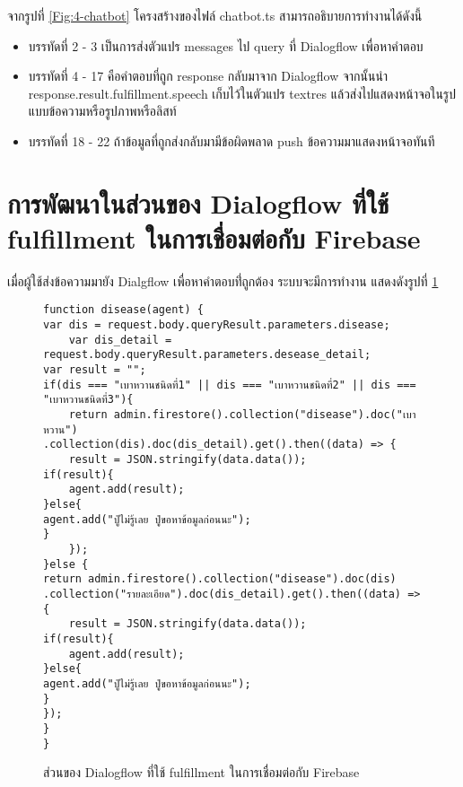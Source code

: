 จากรูปที่ \ref{Fig:4-chatbot} โครงสร้างของไฟล์ chatbot.ts สามารถอธิบายการทำงานได้ดังนี้
\begin{itemize}[label={--}]
\item บรรทัดที่ 2 - 3 เป็นการส่งตัวแปร messages ไป query ที่ Dialogflow เพื่อหาคำตอบ
\item บรรทัดที่ 4 - 17 คือคำตอบที่ถูก response กลับมาจาก Dialogflow จากนั้นนำ response.result.fulfillment.speech เก็บไว้ในตัวแปร textres แล้วส่งไปแสดงหน้าจอในรูปแบบข้อความหรือรูปภาพหรือลิสท์
\item บรรทัดที่ 18 - 22 ถ้าข้อมูลที่ถูกส่งกลับมามีข้อผิดพลาด push ข้อความมาแสดงหน้าจอทันที
\end{itemize}
\newpage



\section{การพัฒนาในส่วนของ Dialogflow ที่ใช้ fulfillment ในการเชื่อมต่อกับ Firebase}
เมื่อผู้ใช้ส่งข้อความมายัง Dialgflow เพื่อหาคำตอบที่่ถูกต้อง ระบบจะมีการทำงาน แสดงดังรูปที่ \ref{Fig:4-addchatbot}
\begin{figure}[H]
	{\begin{lstlisting}
function disease(agent) {
var dis = request.body.queryResult.parameters.disease;
	var dis_detail = request.body.queryResult.parameters.desease_detail;
var result = "";
if(dis === "เบาหวานชนิดที่1" || dis === "เบาหวานชนิดที่2" || dis === "เบาหวานชนิดที่3"){
	return admin.firestore().collection("disease").doc("เบาหวาน")
.collection(dis).doc(dis_detail).get().then((data) => {
	result = JSON.stringify(data.data());
if(result){
	agent.add(result);
}else{
agent.add("ปู่ไม่รู้เลย ปู่ขอหาข้อมูลก่อนนะ");
} 
	});
}else {
return admin.firestore().collection("disease").doc(dis)
.collection("รายละเอียด").doc(dis_detail).get().then((data) => {
	result = JSON.stringify(data.data());
if(result){
	agent.add(result);
}else{
agent.add("ปู่ไม่รู้เลย ปู่ขอหาข้อมูลก่อนนะ");
}
});
}
}
	\end{lstlisting}}
	\caption{ส่วนของ Dialogflow ที่ใช้ fulfillment ในการเชื่อมต่อกับ Firebase}
	\label{Fig:4-addchatbot}
\end{figure}
\newpage

